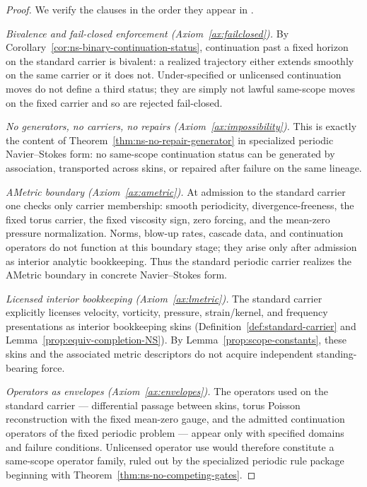\begin{proof}
We verify the clauses in the order they appear in .

\smallskip
\noindent\textit{Bivalence and fail-closed enforcement (Axiom~\ref{ax:failclosed}).}
By Corollary~\ref{cor:ns-binary-continuation-status}, continuation past a fixed horizon on the
standard carrier is bivalent: a realized trajectory either extends smoothly on the same carrier or it
does not. Under-specified or unlicensed continuation moves do not define a third status; they are
simply not lawful same-scope moves on the fixed carrier and so are rejected fail-closed.

\smallskip
\noindent\textit{No generators, no carriers, no repairs (Axiom~\ref{ax:impossibility}).}
This is exactly the content of Theorem~\ref{thm:ns-no-repair-generator} in specialized periodic
Navier--Stokes form: no same-scope continuation status can be generated by association, transported
across skins, or repaired after failure on the same lineage.

\smallskip
\noindent\textit{AMetric boundary (Axiom~\ref{ax:ametric}).}
At admission to the standard carrier one checks only carrier membership: smooth periodicity,
divergence-freeness, the fixed torus carrier, the fixed viscosity sign, zero forcing, and the
mean-zero pressure normalization. Norms, blow-up rates, cascade data, and continuation operators do
not function at this boundary stage; they arise only after admission as interior analytic bookkeeping.
Thus the standard periodic carrier realizes the AMetric boundary in concrete Navier--Stokes form.

\smallskip
\noindent\textit{Licensed interior bookkeeping (Axiom~\ref{ax:lmetric}).}
The standard carrier explicitly licenses velocity, vorticity, pressure, strain/kernel, and frequency
presentations as interior bookkeeping skins (Definition~\ref{def:standard-carrier} and
Lemma~\ref{prop:equiv-completion-NS}). By Lemma~\ref{prop:scope-constants}, these skins and the
associated metric descriptors do not acquire independent standing-bearing force.

\smallskip
\noindent\textit{Operators as envelopes (Axiom~\ref{ax:envelopes}).}
The operators used on the standard carrier --- differential passage between skins, torus Poisson
reconstruction with the fixed mean-zero gauge, and the admitted continuation operators of the fixed
periodic problem --- appear only with specified domains and failure conditions. Unlicensed operator
use would therefore constitute a same-scope operator family, ruled out by the specialized periodic
rule package beginning with Theorem~\ref{thm:ns-no-competing-gates}.


\end{proof}

